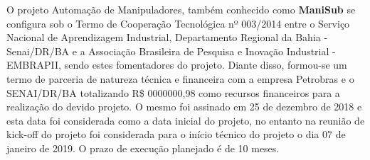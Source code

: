 O projeto Automação de Manipuladores, também conhecido como \textbf{ManiSub} se configura sob o Termo de Cooperação Tecnológica nº 003/2014 entre o Serviço Nacional de Aprendizagem Industrial, Departamento Regional da Bahia - Senai/DR/BA e a Associação Brasileira de Pesquisa e Inovação Industrial - EMBRAPII, sendo estes fomentadores do projeto. Diante disso, formou-se um termo de parceria de natureza técnica e financeira com a empresa Petrobras e o SENAI/DR/BA totalizando R\$ 0000000,98 como recursos financeiros para a realização do devido projeto. O mesmo foi assinado em 25 de dezembro de 2018 e esta data foi considerada como a data inicial do projeto, no entanto na reunião de kick-off do projeto foi considerada para o início técnico do projeto o dia 07 de janeiro de 2019. O prazo de execução planejado é de 10 meses.


